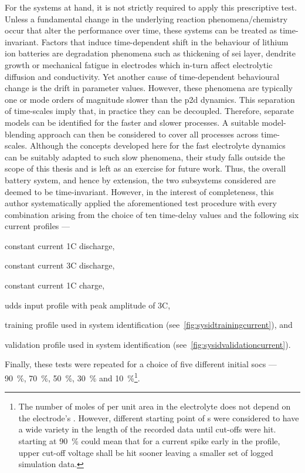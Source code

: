 For the systems at hand, it is  not strictly required to apply this prescriptive
test. Unless a fundamental change in the underlying reaction phenomena/chemistry
occur that  alter the  performance over  time, these systems  can be  treated as
time-invariant. Factors  that induce  time-dependent shift  in the  behaviour of
lithium ion batteries are degradation  phenomena such as thickening of \gls{sei}
layer, dendrite growth or mechanical  fatigue in electrodes which in-turn affect
electrolytic  diffusion and  conductivity. Yet  another cause  of time-dependent
behavioural change  is the drift  in parameter values. However,  these phenomena
are  typically  one or  mode  orders  of  magnitude  slower than  the  \gls{p2d}
dynamics. This separation  of time-scales imply that, in
practice they can be decoupled. Therefore, separate models can be identified for
the faster and slower processes. A  suitable model-blending approach can then be
considered  to cover  all processes  across time-scales.  Although the  concepts
developed here for the fast electrolyte dynamics can be suitably adapted to such
slow phenomena, their study  falls outside the scope of this  thesis and is left
as an exercise for  future work. Thus, the overall battery  system, and hence by
extension,  the  two subsystems  considered  are  deemed to  be  time-invariant.
However, in the interest of completeness, this author systematically applied the
aforementioned test procedure with every  combination arising from the choice of
ten time-delay values and the following six current profiles ---
\begin{enumerate*}[label=\emph{\alph*})]
    \item constant current 1C discharge,
    \item constant current 3C discharge,
    \item constant current 1C charge,
    \item \gls{udds} input profile with peak amplitude of 3C,
    \item training profile used in system identification (see~\cref{fig:sysidtrainingcurrent}), and
    \item validation profile used in system identification (see~\cref{fig:sysidvalidationcurrent}).
\end{enumerate*}
Finally,  these tests  were  repeated for  a choice  of  five different  initial
\glspl{soc}   ---   \SI{90}{\percent},   \SI{70}{\percent},   \SI{50}{\percent},
\SI{30}{\percent}  and \SI{10}{\percent}\footnote{\label{fn:socstart}The  number
of  moles  of   per  unit  area  in  the  electrolyte does  not  depend
on  the  electrode's .  However,  different  starting point  of
s were considered  to have a wide variety in  the length of the
recorded  data until  cut-offs  were hit.  \eg{}  starting at  \SI{90}{\percent}
 could  mean that  for a  current spike  early in  the profile,
upper  cut-off voltage  shall be  hit  sooner leaving  a smaller  set of  logged
simulation data.}.

